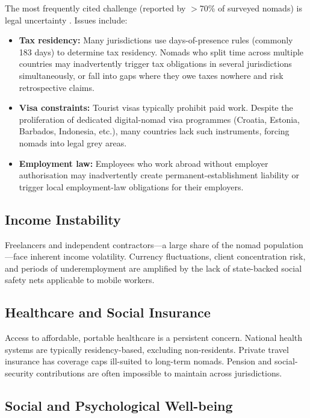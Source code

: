 \documentclass[12pt,a4paper]{article}
\begin{document}
The most frequently cited challenge (reported by $>$70\% of surveyed nomads)
is legal uncertainty \citep{A-List2023}. Issues include:

\begin{itemize}
  \item \textbf{Tax residency:} Many jurisdictions use days-of-presence rules
        (commonly 183 days) to determine tax residency. Nomads who split time
        across multiple countries may inadvertently trigger tax obligations in
        several jurisdictions simultaneously, or fall into gaps where they owe
        taxes nowhere and risk retrospective claims.

  \item \textbf{Visa constraints:} Tourist visas typically prohibit paid work.
        Despite the proliferation of dedicated digital-nomad visa programmes
        (Croatia, Estonia, Barbados, Indonesia, etc.), many countries lack such
        instruments, forcing nomads into legal grey areas.

  \item \textbf{Employment law:} Employees who work abroad without employer
        authorisation may inadvertently create permanent-establishment liability
        or trigger local employment-law obligations for their employers.
\end{itemize}

\subsection{Income Instability}

Freelancers and independent contractors—a large share of the nomad population
—face inherent income volatility. Currency fluctuations, client concentration
risk, and periods of underemployment are amplified by the lack of state-backed
social safety nets applicable to mobile workers.

\subsection{Healthcare and Social Insurance}

Access to affordable, portable healthcare is a persistent concern. National
health systems are typically residency-based, excluding non-residents. Private
travel insurance has coverage caps ill-suited to long-term nomads. Pension and
social-security contributions are often impossible to maintain across
jurisdictions.

\subsection{Social and Psychological Well-being}
\end{document}
